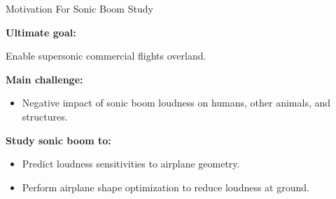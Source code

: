 \documentclass{beamer}
\newcounter{sectionframecount}
\begin{document}

\begin{frame}[t]{Motivation For Sonic Boom Study}
  \vspace{-5pt}
  \begin{minipage}[t]{0.55\linewidth}
    \textbf{Ultimate goal:}

    Enable supersonic commercial flights overland.

    {
    \vspace{10pt}
    \textbf{Main challenge:}

    \begin{itemize}
      \item Negative impact of sonic boom loudness on humans, other animals, and structures.
    \end{itemize}
    }

    {
    \vspace{10pt}
    \textbf{Study sonic boom to:}
    \begin{itemize}
      \item Predict loudness sensitivities to airplane geometry.
      \item Perform airplane shape optimization to reduce loudness at ground.
    \end{itemize}
    }
  \end{minipage}



\end{frame}
\end{document}
